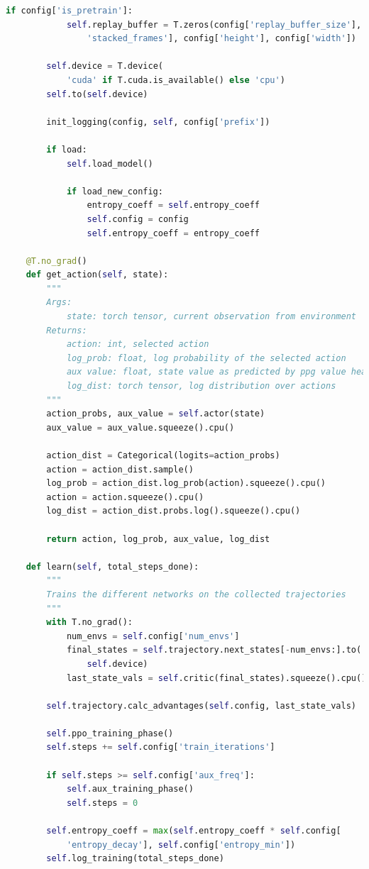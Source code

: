 \documentclass{article}
\begin{document}
\begin{lstlisting}[language=Python]
        if config['is_pretrain']:
            self.replay_buffer = T.zeros(config['replay_buffer_size'], config[
                'stacked_frames'], config['height'], config['width'])

        self.device = T.device(
            'cuda' if T.cuda.is_available() else 'cpu')
        self.to(self.device)

        init_logging(config, self, config['prefix'])

        if load:
            self.load_model()

            if load_new_config:
                entropy_coeff = self.entropy_coeff
                self.config = config
                self.entropy_coeff = entropy_coeff

    @T.no_grad()
    def get_action(self, state):
        """
        Args:
            state: torch tensor, current observation from environment
        Returns:
            action: int, selected action
            log_prob: float, log probability of the selected action
            aux value: float, state value as predicted by ppg value head 
            log_dist: torch tensor, log distribution over actions
        """
        action_probs, aux_value = self.actor(state)
        aux_value = aux_value.squeeze().cpu()

        action_dist = Categorical(logits=action_probs)
        action = action_dist.sample()
        log_prob = action_dist.log_prob(action).squeeze().cpu()
        action = action.squeeze().cpu()
        log_dist = action_dist.probs.log().squeeze().cpu()

        return action, log_prob, aux_value, log_dist

    def learn(self, total_steps_done):
        """
        Trains the different networks on the collected trajectories
        """
        with T.no_grad():
            num_envs = self.config['num_envs']
            final_states = self.trajectory.next_states[-num_envs:].to(
                self.device)
            last_state_vals = self.critic(final_states).squeeze().cpu()

        self.trajectory.calc_advantages(self.config, last_state_vals)

        self.ppo_training_phase()
        self.steps += self.config['train_iterations']

        if self.steps >= self.config['aux_freq']:
            self.aux_training_phase()
            self.steps = 0

        self.entropy_coeff = max(self.entropy_coeff * self.config[
            'entropy_decay'], self.config['entropy_min'])
        self.log_training(total_steps_done)


\end{lstlisting}
\end{document}
